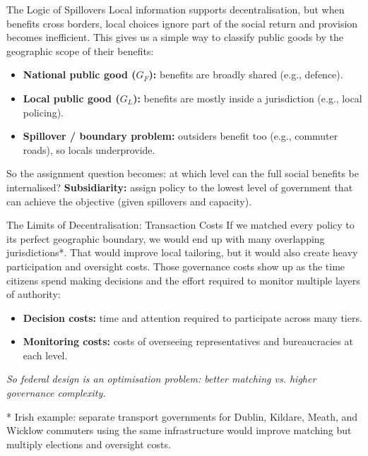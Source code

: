 \documentclass[10pt]{beamer}
\begin{document}
\begin{frame}{The Logic of Spillovers}
Local information supports decentralisation, but when benefits cross borders, local choices ignore part of the social return and provision becomes inefficient. This gives us a simple way to classify public goods by the geographic scope of their benefits:

\begin{itemize}
\item \textbf{National public good ($G_F$):} benefits are broadly shared (e.g., defence).
\item \textbf{Local public good ($G_L$):} benefits are mostly inside a jurisdiction (e.g., local policing).
\item \textbf{Spillover / boundary problem:} outsiders benefit too (e.g., commuter roads), so locals underprovide.
\end{itemize}

\vspace{0.2cm}
So the assignment question becomes: at which level can the full social benefits be internalised?
\alert{\textbf{Subsidiarity:} assign policy to the lowest level of government that can achieve the objective (given spillovers and capacity).}
\end{frame}

\begin{frame}{The Limits of Decentralisation: Transaction Costs}
If we matched every policy to its perfect geographic boundary, we would end up with many overlapping jurisdictions*. That would improve local tailoring, but it would also create heavy participation and oversight costs. Those governance costs show up as the time citizens spend making decisions and the effort required to monitor multiple layers of authority:

\begin{itemize}
\item \textbf{Decision costs:} time and attention required to participate across many tiers.
\item \textbf{Monitoring costs:} costs of overseeing representatives and bureaucracies at each level.
\end{itemize}

\vspace{0.15cm}
\footnotesize
\textit{So federal design is an optimisation problem: better matching vs. higher governance complexity.}

\vspace{0.15cm}
* Irish example: separate transport governments for Dublin, Kildare, Meath, and Wicklow commuters using the same infrastructure would improve matching but multiply elections and oversight costs.
\end{frame}
\end{document}
